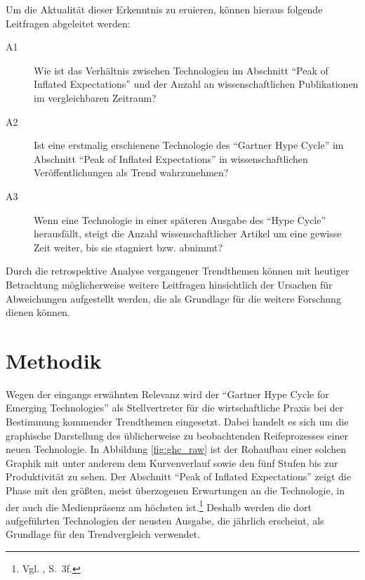 Um die Aktualität dieser Erkenntnis zu eruieren, können hieraus folgende Leitfragen abgeleitet werden:

\begin{description}
	\item[A1] Wie ist das Verhältnis zwischen Technologien im Abschnitt "`Peak of Inflated Expectations"' und der Anzahl an wissenschaftlichen Publikationen im vergleichbaren Zeitraum?
\end{description}

\begin{description}
	\item[A2] Ist eine erstmalig erschienene Technologie des "`Gartner Hype Cycle"' im Ab\-schnitt "`Peak of Inflated Expectations"' in wissen\-schaftlichen Ver\-öf\-fent\-lichungen als Trend wahrzunehmen?
\end{description}

\begin{description}
	\item[A3] Wenn eine Technologie in einer späteren Ausgabe des "`Hype Cycle"' herausfällt, steigt die Anzahl wissenschaftlicher Artikel um eine gewisse Zeit weiter, bis sie stagniert bzw. abnimmt?
\end{description}

Durch die retrospektive Analyse vergangener Trendthemen können mit heutiger Betrachtung möglicherweise weitere Leitfragen hinsichtlich der Ursachen für Abweichungen aufgestellt werden, die als Grundlage für die weitere Forschung dienen können.

\section{Methodik}
Wegen der eingangs erwähnten Relevanz wird der "`Gartner Hype Cycle for Emerging Technologies"' als Stellvertreter für die wirtschaftliche Praxis bei der Bestimmung kommender Trendthemen eingesetzt. Dabei handelt es sich um die graphische Darstellung des üblicherweise zu beobachtenden Reifeprozesses einer neuen Technologie. In Abbildung \ref{fig:ghc_raw} ist der Rohaufbau einer solchen Graphik mit unter anderem dem Kurvenverlauf sowie den fünf Stufen bis zur Produktivität zu sehen. Der Abschnitt "`Peak of Inflated Expectations"' zeigt die Phase mit den größten, meist überzogenen Erwartungen an die Technologie, in der auch die Medienpräsenz am höchsten ist.\footnote{Vgl. , S.~3f.} Deshalb werden die dort aufgeführten Technologien der neusten Ausgabe, die jährlich erscheint, als Grundlage für den Trendvergleich verwendet.

